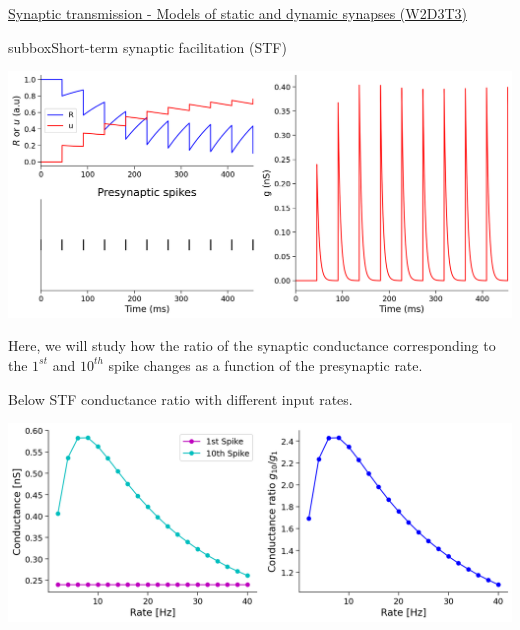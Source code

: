 \begin{textbox}{\href{https://compneuro.neuromatch.io/tutorials/W2D3_BiologicalNeuronModels/student/W2D3_Tutorial3.html}{Synaptic transmission - Models of static and dynamic synapses (W2D3T3)} }
\begin{subbox}{subbox}{Short-term synaptic facilitation (STF)}
\begin{center}
    
\includegraphics[scale=0.14]{Figures/BNM/LIF_Figure12.png}
\end{center}

Here, we will study how the ratio of the synaptic conductance corresponding to the $1^{st}$ and $10^{th}$ spike changes as a function of the presynaptic rate. 

Below STF conductance ratio with different input rates.
\begin{center}
    
\includegraphics[scale=0.14]{Figures/BNM/LIF_Figure13.png}
\end{center}

\end{subbox}

\end{textbox}
